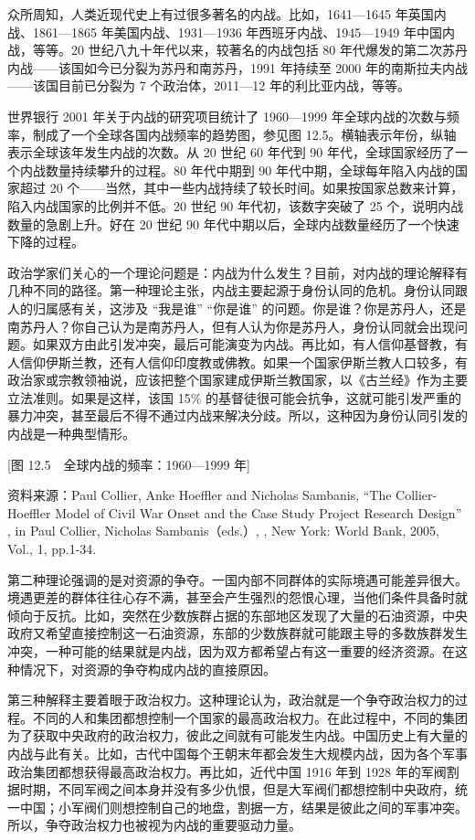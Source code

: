 众所周知，人类近现代史上有过很多著名的内战。比如，1641—1645 年英国内战、1861—1865 年美国内战、1931—1936 年西班牙内战、1945—1949 年中国内战，等等。20 世纪八九十年代以来，较著名的内战包括 80 年代爆发的第二次苏丹内战——该国如今已分裂为苏丹和南苏丹，1991 年持续至 2000 年的南斯拉夫内战——该国目前已分裂为 7 个政治体，2011—12 年的利比亚内战，等等。

世界银行 2001 年关于内战的研究项目统计了 1960—1999 年全球内战的次数与频率，制成了一个全球各国内战频率的趋势图，参见图 12.5。横轴表示年份，纵轴表示全球该年发生内战的次数。从 20 世纪 60 年代到 90 年代，全球国家经历了一个内战数量持续攀升的过程。80 年代中期到 90 年代中期，全球每年陷入内战的国家超过 20 个——当然，其中一些内战持续了较长时间。如果按国家总数来计算，陷入内战国家的比例并不低。20 世纪 90 年代初，该数字突破了 25 个，说明内战数量的急剧上升。好在 20 世纪 90 年代中期以后，全球内战数量经历了一个快速下降的过程。

政治学家们关心的一个理论问题是：内战为什么发生？目前，对内战的理论解释有几种不同的路径。第一种理论主张，内战主要起源于身份认同的危机。身份认同跟人的归属感有关，这涉及 “我是谁”  “你是谁” 的问题。你是谁？你是苏丹人，还是南苏丹人？你自己认为是南苏丹人，但有人认为你是苏丹人，身份认同就会出现问题。如果双方由此引发冲突，最后可能演变为内战。再比如，有人信仰基督教，有人信仰伊斯兰教，还有人信仰印度教或佛教。如果一个国家伊斯兰教人口较多，有政治家或宗教领袖说，应该把整个国家建成伊斯兰教国家，以《古兰经》作为主要立法准则。如果是这样，该国 15\% 的基督徒很可能会抗争，这就可能引发严重的暴力冲突，甚至最后不得不通过内战来解决分歧。所以，这种因为身份认同引发的内战是一种典型情形。

[图 12.5　全球内战的频率：1960—1999 年]

资料来源：Paul Collier, Anke Hoeffler and Nicholas Sambanis, “The Collier-Hoeffler Model of Civil War Onset and the Case Study Project Research Design” , in Paul Collier, Nicholas Sambanis（eds.）, , New York: World Bank, 2005, Vol., 1, pp.1-34.

第二种理论强调的是对资源的争夺。一国内部不同群体的实际境遇可能差异很大。境遇更差的群体往往心存不满，甚至会产生强烈的怨恨心理，当他们条件具备时就倾向于反抗。比如，突然在少数族群占据的东部地区发现了大量的石油资源，中央政府又希望直接控制这一石油资源，东部的少数族群就可能跟主导的多数族群发生冲突，一种可能的结果就是内战，因为双方都希望占有这一重要的经济资源。在这种情况下，对资源的争夺构成内战的直接原因。

第三种解释主要着眼于政治权力。这种理论认为，政治就是一个争夺政治权力的过程。不同的人和集团都想控制一个国家的最高政治权力。在此过程中，不同的集团为了获取中央政府的政治权力，彼此之间就有可能发生内战。中国历史上有大量的内战与此有关。比如，古代中国每个王朝末年都会发生大规模内战，因为各个军事政治集团都想获得最高政治权力。再比如，近代中国 1916 年到 1928 年的军阀割据时期，不同军阀之间本身并没有多少仇恨，但是大军阀们都想控制中央政府，统一中国；小军阀们则想控制自己的地盘，割据一方，结果是彼此之间的军事冲突。所以，争夺政治权力也被视为内战的重要驱动力量。

